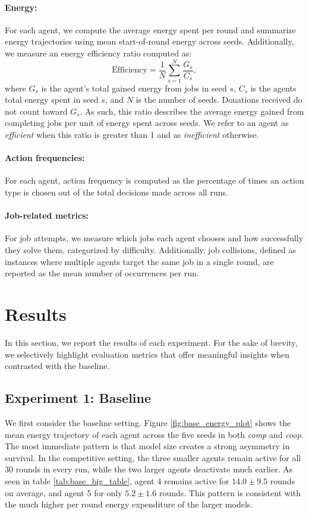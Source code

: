 \documentclass[sigconf,nonacm]{acmart}
\begin{document}
\paragraph{\textbf{Energy}:}
For each agent, we compute the average energy spent per round and summarize energy trajectories using mean start-of-round energy across seeds.
Additionally, we measure an energy efficiency ratio computed as:
\begin{equation*}
    \text{Efficiency} = \frac{1}{N}\sum_{s=1}^{N}\frac{G_s}{C_s},
\end{equation*}
where \(G_s\) is the agent's total gained energy from jobs in seed \(s\), \(C_s\) is the agents total energy spent in seed \(s\), and \(N\) is the number of seeds.
Donations received do not count toward \(G_s\).
As such, this ratio describes the average energy gained from completing jobs per unit of energy spent across seeds.
We refer to an agent as \textit{efficient} when this ratio is greater than 1 and as \textit{inefficient} otherwise.

\paragraph{\textbf{Action frequencies}:}
For each agent, action frequency is computed as the percentage of times an action type is chosen out of the total decisions made across all runs.

\paragraph{\textbf{Job-related metrics}:}
For job attempts, we measure which jobs each agent chooses and how successfully they solve them, categorized by difficulty.
Additionally, job collisions, defined as instances where multiple agents target the same job in a single round, are reported as the mean number of occurrences per run.

\section{Results}
In this section, we report the results of each experiment.
For the sake of brevity, we selectively highlight evaluation metrics that offer meaningful insights when contrasted with the baseline.

\subsection{Experiment 1: Baseline}
We first consider the baseline setting. Figure \ref{fig:base_energy_plot} shows the mean energy trajectory of each agent across the five seeds in both \textit{comp} and \textit{coop}.
The most immediate pattern is that model size creates a strong asymmetry in survival.
In the competitive setting, the three smaller agents remain active for all 30 rounds in every run, while the two larger agents deactivate much earlier.
As seen in table \ref{tab:base_big_table}, agent 4 remains active for \(14.0\pm9.5\) rounds on average, and agent 5 for only \(5.2\pm1.6\) rounds.
This pattern is consistent with the much higher per round energy expenditure of the larger models.
\end{document}
